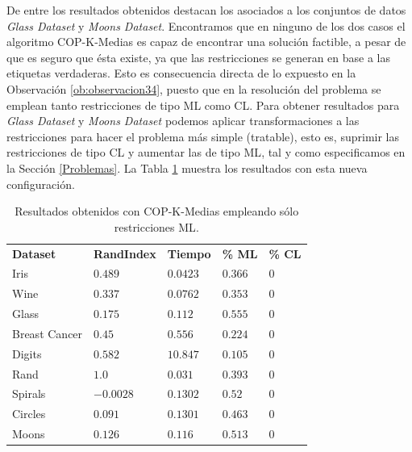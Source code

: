 De entre los resultados obtenidos destacan los asociados a los conjuntos de datos \textit{Glass Dataset} y \textit{Moons Dataset}. Encontramos que en ninguno de los dos casos el algoritmo COP-K-Medias es capaz de encontrar una solución factible, a pesar de que es seguro que ésta existe, ya que las restricciones se generan en base a las etiquetas verdaderas. Esto es consecuencia directa de lo expuesto en la Observación \ref{ob:observacion34}, puesto que en la resolución del problema se emplean tanto restricciones de tipo \acs{ML} como \acs{CL}. Para obtener resultados para \textit{Glass Dataset} y \textit{Moons Dataset} podemos aplicar transformaciones a las restricciones para hacer el problema más simple (tratable), esto es, suprimir las restricciones de tipo \acs{CL} y aumentar las de tipo \acs{ML}, tal y como especificamos en la Sección \ref{Problemas}. La Tabla \ref{tab:tabla6} muestra los resultados con esta nueva configuración.

\begin{table}[!h]
	\centering
	\setlength{\arrayrulewidth}{1mm}
	\setlength{\tabcolsep}{10pt}
	\renewcommand{\arraystretch}{0.75}
	
	\begin{tabular}{ >{\centering\arraybackslash}m{2.5cm}  >{\centering\arraybackslash}m{1.8cm}>{\centering\arraybackslash}m{1.5cm}>{\centering\arraybackslash}m{1.2cm}>{\centering\arraybackslash}m{1.2cm}}
		\hline
		\rowcolor{black}
		\multicolumn{5}{c}{\bf \color{white}{Resultados de COP-K-Medias con restricciones ML}}\\
		\hline
		\rowcolor{gray!50}
		\textbf{Dataset} & \textbf{RandIndex} & \textbf{Tiempo} & \textbf{\% ML} & \textbf{\% CL}  \\
		Iris & $0.489$ & $0.0423$ & $0.366$ & $0$ \\
		Wine & $0.337$ & $0.0762$ & $0.353$ & $0$ \\
		Glass & $0.175$ & $0.112$ & $0.555$ & $0$ \\
		Breast Cancer & $0.45$ & $0.556$ & $0.224$ & $0$ \\
		Digits & $0.582$ & $10.847$ & $0.105$ & $0$ \\
		Rand & $1.0$ & $0.031$ & $0.393$ & $0$ \\
		Spirals & $-0.0028$ & $0.1302$ & $0.52$ & $0$ \\
		Circles & $0.091$ & $0.1301$ & $0.463$ & $0$ \\
		Moons & $0.126$ & $0.116$ & $0.513$ & $0$ \\
		\hline
		
	\end{tabular}
	\caption{Resultados obtenidos con COP-K-Medias empleando sólo restricciones \acs{ML}.}
	\label{tab:tabla6}
\end{table}

